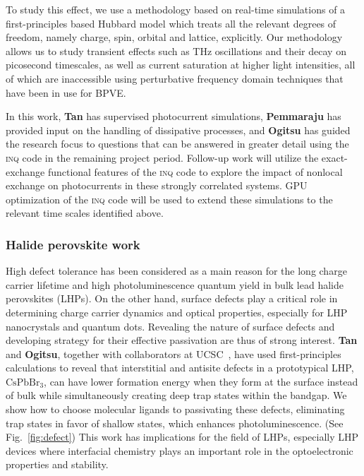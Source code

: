 To study this effect, we use a methodology based on real-time simulations of a first-principles based Hubbard model which treats all the relevant degrees of freedom, namely charge, spin, orbital and lattice, explicitly. 
Our methodology allows us to study transient effects such as THz oscillations and their decay on picosecond timescales, as well as current saturation at higher light intensities, all of which are inaccessible using perturbative frequency domain techniques that have been in use for BPVE. 

In this work, {\bf Tan} has supervised photocurrent simulations, {\bf Pemmaraju} has provided input on the handling of dissipative processes, and {\bf Ogitsu} has guided the research focus to questions that can be answered in greater detail using the \textsc{inq} code in the remaining project period. 
Follow-up work will utilize the exact-exchange functional features of the \textsc{inq} code to explore the impact of nonlocal exchange on photocurrents in these strongly correlated systems. 
GPU optimization of the \textsc{inq} code will be used to extend these simulations to the relevant time scales identified above.  

\subsubsection{Halide perovskite work}

High defect tolerance has been considered as a main reason for the long charge carrier lifetime and high photoluminescence quantum yield in bulk lead halide perovskites (LHPs). 
On the other hand, surface defects play a critical role in determining charge carrier dynamics and optical properties, especially for LHP nanocrystals and quantum dots. Revealing the nature of surface defects and developing strategy for their effective passivation are thus of strong interest. 
{\bf Tan} and {\bf Ogitsu}, together with collaborators at UCSC~\cite{Smart2021}, have used first-principles calculations to reveal that interstitial and antisite defects in a prototypical LHP, \(\mathrm{CsPbBr_3}\), can have lower formation energy when they form at the surface instead of bulk while simultaneously creating deep trap states within the bandgap.
We show how to choose molecular ligands to passivating these defects, eliminating trap states in favor of shallow states, which enhances photoluminescence. 
(See Fig.~\ref{fig:defect}) This work has implications for  the field of LHPs, especially LHP devices where interfacial chemistry plays an important role in the optoelectronic properties and stability.

